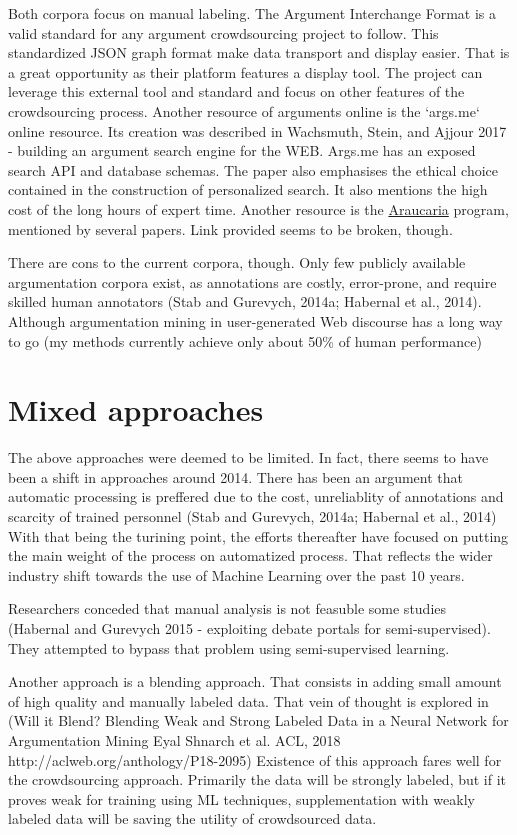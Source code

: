 \documentclass{article}
\begin{document}
Both corpora focus on manual labeling.
The Argument Interchange Format is a valid standard for any argument crowdsourcing project to follow.  This standardized JSON graph format make data transport and display easier. That is a great opportunity as their platform features a display tool.  The project can leverage this external tool and standard and focus on other features of the crowdsourcing process.
Another resource of arguments online is the `args.me` online resource. 
Its creation was described in Wachsmuth, Stein, and Ajjour 2017 - building an argument search engine for the WEB.
Args.me has an exposed search API and database schemas. The paper also emphasises the ethical choice contained in the construction of personalized search.
It also mentions the high cost of the long hours of expert time.
Another resource is the \href{http://araucaria.computing.dundee.ac.uk/}{Araucaria} program, mentioned by several papers. Link provided seems to be broken, though. 

There are cons to the current corpora, though.
Only few publicly available argumentation corpora exist, as annotations are costly, error-prone, and require skilled human annotators (Stab and Gurevych, 2014a; Habernal et al., 2014).
Although argumentation mining in user-generated Web discourse has a long way to go (my  methods currently achieve only about 50\% of human performance)

\section{Mixed approaches}
The above approaches were deemed to be limited. In fact, there seems to have been a shift in approaches around 2014.
There has been an argument that automatic processing is preffered due to the cost, unreliablity of annotations and scarcity of trained personnel
(Stab and Gurevych, 2014a; Habernal et al., 2014)
With that being the turining point, the efforts thereafter have focused on putting the main weight of the process on automatized process. 
That reflects the wider industry shift towards the use of Machine Learning over the past 10 years.

Researchers conceded that manual analysis is not feasuble some studies (Habernal and Gurevych 2015 - exploiting debate portals for semi-supervised).
They attempted to bypass that problem using semi-supervised learning.

Another approach is a blending approach. That consists in adding small amount of high quality and manually labeled data.
That vein of thought is explored in (Will it Blend? Blending Weak and Strong Labeled Data in a Neural Network for Argumentation Mining Eyal Shnarch et al.
ACL, 2018 http://aclweb.org/anthology/P18-2095)
Existence of this approach fares well for the crowdsourcing approach. Primarily the data will be strongly labeled, but if it proves weak for training using ML techniques, 
supplementation with weakly labeled data will be saving the utility of crowdsourced data.
\end{document}
